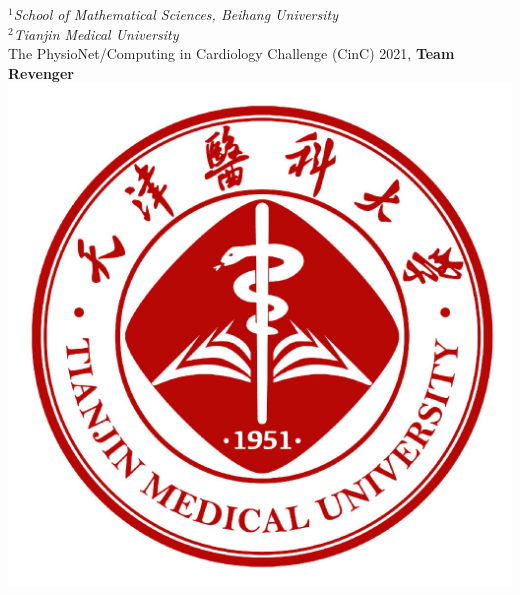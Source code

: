 \documentclass[a0paper,portrait]{baposter}
\begin{document}
\begin{poster}
{\smaller $^1${\it School of Mathematical Sciences, Beihang University} \\ $^2${\it Tianjin Medical University} \\
{\Large The PhysioNet/Computing in Cardiology Challenge (CinC) 2021, \bf{Team Revenger}}
} %
{\includegraphics[scale=0.072]{images/logo_tmu.jpeg}} %




\end{poster}
\end{document}
